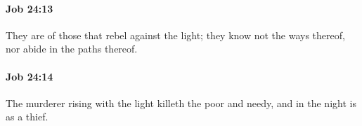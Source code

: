 		\paragraph{Job 24:13} %
			\label{JOB-24-13}

			They are of those that rebel against the light; they know not the ways thereof, nor abide in the paths thereof.


		\paragraph{Job 24:14} %
			\label{JOB-24-14}

			The murderer rising with the light killeth the poor and needy, and in the night is as a thief.


